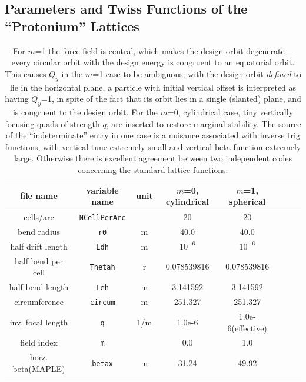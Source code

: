 \documentclass[]{article}
\begin{document}
\subsection{Parameters and Twiss Functions of the ``Protonium'' Lattices}
%
\begin{table}[h]
\caption{\label{tbl:ProtoniumParams}For $m$=1 the force field is central, which makes
the design orbit degenerate---every circular orbit with the design energy is 
congruent to an equatorial orbit.
This causes $Q_y$ in the $m$=1 case to be ambiguous; with the design orbit \emph{defined}
to lie in the horizontal plane, a particle with initial vertical offset is interpreted
as having $Q_y$=1, in spite of the fact that its orbit lies in a single (slanted) plane, 
and is congruent to the design orbit. For the $m$=0, cylindrical case, tiny vertically 
focusing quads of strength $q$, are inserted to restore marginal stability. The
source of the ``indeterminate'' entry in one case is a nuisance associated with inverse trig
functions, with vertical tune extremely small and vertical beta function extremely
large. Otherwise there is excellent agreement between two independent codes concerning
the standard lattice functions.} 
\medskip
\centering
\begin{tabular}{|c|c|c|c|c|c|c|c|}           \hline
file name           & variable name     & unit &   $m$=0, cylindrical  &  $m$=1, spherical   \\ \hline
cells/arc           & {\tt NCellPerArc} &      &      20               &       20            \\
bend radius         &  {\tt r0}         &  m   &     40.0              &      40.0           \\
half drift length   &  {\tt Ldh}        &  m   &   $10^{-6}$            &   $10^{-6}$         \\
half bend per cell  & {\tt Thetah}      &  r   &   0.078539816         &  0.078539816        \\
half bend length    & {\tt Leh}         &  m   &    3.141592           &  3.141592           \\
circumference       & {\tt circum}      &  m   &    251.327            &   251.327           \\ \hline
inv. focal length   &  {\tt q}          & 1/m  &    1.0e-6             &  1.0e-6(effective)  \\
field index         &  {\tt m}          &      &      0.0              &    1.0              \\ \hline
%
horz. beta(MAPLE)   & {\tt betax}       &  m   &     31.24             &   49.92             \\

\end{tabular}
\end{table}
\end{document}
